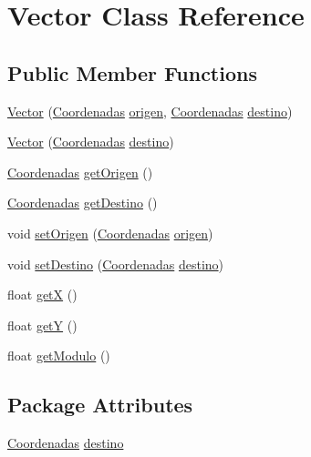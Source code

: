 \hypertarget{class_vector}{}\section{Vector Class Reference}
\label{class_vector}
\subsection*{Public Member Functions}
\begin{DoxyCompactItemize}
\item 
\mbox{\hyperlink{class_vector_aff16a046f1232ec3c1e00f6b01e2e48c}{Vector}} (\mbox{\hyperlink{class_coordenadas}{Coordenadas}} \mbox{\hyperlink{class_vector_a3c83b7dd875429ec0bb3a799d928bc47}{origen}}, \mbox{\hyperlink{class_coordenadas}{Coordenadas}} \mbox{\hyperlink{class_vector_af0a20e915c3efce53463578d8e73948e}{destino}})
\item 
\mbox{\hyperlink{class_vector_ae4d8991b3f3cac54955a6fc0dcad9550}{Vector}} (\mbox{\hyperlink{class_coordenadas}{Coordenadas}} \mbox{\hyperlink{class_vector_af0a20e915c3efce53463578d8e73948e}{destino}})
\item 
\mbox{\hyperlink{class_coordenadas}{Coordenadas}} \mbox{\hyperlink{class_vector_a27cc1a78b33cfa545f94d24ad0120c1d}{get\+Origen}} ()
\item 
\mbox{\hyperlink{class_coordenadas}{Coordenadas}} \mbox{\hyperlink{class_vector_ae6c100e98564be0a47f1c755948eba0a}{get\+Destino}} ()
\item 
void \mbox{\hyperlink{class_vector_a3ed415ef492b294d7ed8cf66f76a8b67}{set\+Origen}} (\mbox{\hyperlink{class_coordenadas}{Coordenadas}} \mbox{\hyperlink{class_vector_a3c83b7dd875429ec0bb3a799d928bc47}{origen}})
\item 
void \mbox{\hyperlink{class_vector_acc3b5049ab01e2a6c7922c12347eb0cb}{set\+Destino}} (\mbox{\hyperlink{class_coordenadas}{Coordenadas}} \mbox{\hyperlink{class_vector_af0a20e915c3efce53463578d8e73948e}{destino}})
\item 
float \mbox{\hyperlink{class_vector_a3d9de615137bc20dd4f1d6aa8fefa167}{getX}} ()
\item 
float \mbox{\hyperlink{class_vector_ac862d32aed23f8ca72176940f76dc1f9}{getY}} ()
\item 
float \mbox{\hyperlink{class_vector_aadab8c5ce31cc4244e8ca06c13bc0b95}{get\+Modulo}} ()
\end{DoxyCompactItemize}
\subsection*{Package Attributes}
\begin{DoxyCompactItemize}
\item 
\mbox{\hyperlink{class_coordenadas}{Coordenadas}} \mbox{\hyperlink{class_vector_af0a20e915c3efce53463578d8e73948e}{destino}}
\end{DoxyCompactItemize}
